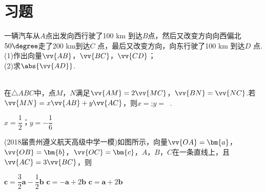 \section{习题}
  \begin{exercise}
    \item%
      一辆汽车从$A $点出发向西行驶了100 km 到达$B $点，然后又改变方向向西偏北$50\degree$走了200 km到达$C$ 点，最后又改变方向，向东行驶了100 km 到达$D$ 点.\\
      (1)作出向量$\vv{AB}$，$\vv{BC}$，$\vv{CD}$；\\
      (2)求$\abs{\vv{AD}}$.\\
    \vspace{4cm}\\
    \begin{minipage}[b]{0.65\linewidth}
    \item%
      在$\triangle ABC$中，点$ M$，$N $满足$ \vv{AM}=2\vv{MC}$，$\vv{BN}=\vv{NC}$.若$\vv{MN}=x\vv{AB}+y\vv{AC}$，则$ x= $\tk;$ y= ~$ \tk.
      \begin{answer}
        $x=\dfrac12$；$y=-\dfrac16$
      \end{answer}
    \end{minipage}
    \begin{minipage}[htbp!]{0.3\linewidth}
      \begin{center}
      \end{center}
    \end{minipage}
    \item
      (2018届贵州遵义航天高级中学一模)如图所示，向量$\vv{OA}=\bm{a}$，$\vv{OB}=\bm{b}$，$\vv{OC}=\bm{c}$，$A$，$B$，$C$在一条直线上，且$\vv{AC}=3\vv{BC}$，则\xz
      \begin{minipage}[b]{0.7\linewidth}
          {$\bm{c}=\dfrac32\bm{a}-\dfrac12\bm{b}$}
          {$\bm{c}=-\bm{a}+2\bm{b}$}
          {$\bm{c}=\bm{a}+2\bm{b}$}
      \end{minipage}\hfill
      \begin{minipage}[htbp!]{0.3\linewidth}
        \begin{center}

\end{center}
\end{minipage}
\end{exercise}
